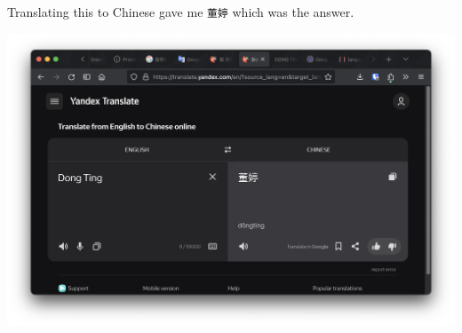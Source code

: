 Translating this to Chinese gave me \texttt{董婷} which was the answer.

\begin{center}
    \includegraphics[width=14cm]{img/OSINT/The pitfall/Screenshot 2023-11-09 at 21.10.43.png}
\end{center}